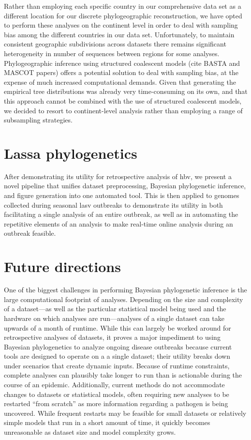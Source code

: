 Rather than employing each specific country in our comprehensive data set as a different location for our discrete phylogeographic reconstruction, we have opted to perform these analyses on the continent level in order to deal with sampling bias among the different countries in our data set.
Unfortunately, to maintain consistent geographic subdivisions across datasets there remains significant heterogeneity in number of sequences between regions for some analyses.
Phylogeographic inference using structured coalescent models (cite BASTA and MASCOT papers) offers a potential solution to deal with sampling bias, at the expense of much increased computational demands.
Given that generating the empirical tree distributions was already very time-consuming on its own, and that this approach cannot be combined with the use of structured coalescent models, we decided to resort to continent-level analysis rather than employing a range of subsampling strategies\cite{hong2020search}.

\section{Lassa phylogenetics}

After demonstrating its utility for retrospective analysis of \gls{hbv}, we present a novel pipeline that unifies dataset preprocessing, Bayesian phylogenetic inference, and figure generation into one automated tool.
This is then applied to genomes collected during seasonal \gls{lasv} outbreaks to demonstrate its utility in both facilitating a single analysis of an entire outbreak, as well as in automating the repetitive elements of an analysis to make real-time online analysis during an outbreak feasible.

\section{Future directions}

One of the biggest challenges in performing Bayesian phylogenetic inference is the large computational footprint of analyses.
Depending on the size and complexity of a dataset---as well as the particular statistical model being used and the hardware on which analyses are run---analyses of a single dataset can take upwards of a month of runtime.
While this can largely be worked around for retrospective analyses of datasets, it proves a major impediment to using Bayesian phylogenetics to analyze ongoing disease outbreaks because current tools are designed to operate on a a single dataset; their utility breaks down under scenarios that create dynamic inputs.
Because of runtime constraints, complete analyses can plausibly take longer to run than is actionable during the course of an epidemic.
Additionally, current methods do not accommodate changes to datasets or statistical models, often requiring new analyses to be restarted ``from scratch'' as more information regarding a pathogen is being uncovered.
While frequent restarts may be feasible for small datasets or relatively simple models that run in a short amount of time, it quickly becomes unreasonable as dataset size and model complexity grows.


